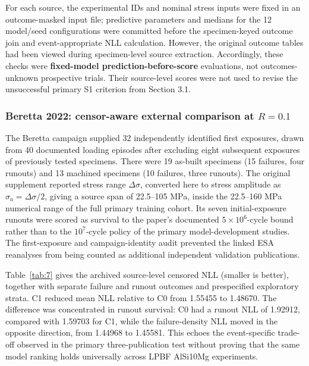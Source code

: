 \documentclass[12pt,a4paper]{article}
\begin{document}
For each source, the experimental IDs and nominal stress inputs were fixed in an outcome-masked input file; predictive parameters and medians for the 12 model/seed configurations were committed before the specimen-keyed outcome join and event-appropriate NLL calculation. However, the original outcome tables had been viewed during specimen-level source extraction. Accordingly, these checks were \textbf{fixed-model prediction-before-score} evaluations, not outcomes-unknown prospective trials. Their source-level scores were not used to revise the unsuccessful primary S1 criterion from Section 3.1.

\subsubsection{Beretta 2022: censor-aware external comparison at \(R=0.1\)}

The Beretta campaign supplied 32 independently identified first exposures, drawn from 40 documented loading episodes after excluding eight subsequent exposures of previously tested specimens. There were 19 as-built specimens (15 failures, four runouts) and 13 machined specimens (10 failures, three runouts). The original supplement reported stress range \(\Delta\sigma\), converted here to stress amplitude as \(\sigma_a=\Delta\sigma/2\), giving a source span of 22.5–105 MPa, inside the 22.5–160 MPa numerical range of the full primary training cohort. Its seven initial-exposure runouts were scored as survival to the paper's documented \(5\times10^6\)-cycle bound rather than to the \(10^7\)-cycle policy of the primary model-development studies. The first-exposure and campaign-identity audit prevented the linked ESA reanalyses from being counted as additional independent validation publications.

Table~\ref{tab:7} gives the archived source-level censored NLL (smaller is better), together with separate failure and runout outcomes and prespecified exploratory strata. C1 reduced mean NLL relative to C0 from 1.55455 to 1.48670. The difference was concentrated in runout survival: C0 had a runout NLL of 1.92912, compared with 1.59703 for C1, while the failure-density NLL moved in the opposite direction, from 1.44968 to 1.45581. This echoes the event-specific trade-off observed in the primary three-publication test without proving that the same model ranking holds universally across LPBF AlSi10Mg experiments.
\end{document}
